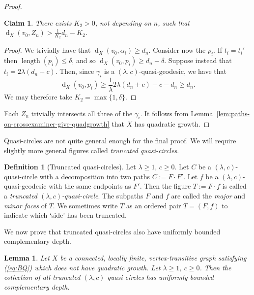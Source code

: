 \documentclass[11pt,a4paper]{amsart}
\DeclareMathOperator{\length}{length}
\DeclareMathOperator{\dist}{d}
\newtheorem{lemma}[theorem]{Lemma}
\newtheorem{claim}[theorem]{Claim}
\theoremstyle{definition}
\newtheorem{definition}[theorem]{Definition}
\newcommand{\property}{(\ref{eq:BQ})}
\begin{document}
\begin{proof}
    \begin{claim}
        There exists $K_2 > 0$, not depending on $n$, such that $\dist_X(v_0, Z_n) > \tfrac 1 {K_2} d_n - K_2$. 
    \end{claim}

    \begin{proof}
        We trivially have that $\dist_X(v_0,\alpha_i) \geq d_n$. Consider now the $p_i$. If $t_i = t_i'$ then $\length(p_i) \leq \delta$, and so $\dist_X(v_0,p_i) \geq d_n - \delta$. Suppose instead that $t_i = 2\lambda(d_n + c)$. Then, since $\gamma_i$ is a $(\lambda,c)$-quasi-geodesic, we have that 
        $$
        \dist_X(v_0,p_i) \geq \frac 1 \lambda 2\lambda(d_n + c) - c - d_n \geq d_n.
        $$
        We may therefore take $K_2 = \max\{1,\delta\}$. 
    \end{proof}

    Each $Z_n$ trivially intersects all three of the $\gamma_i$. It follows from Lemma~\ref{lem:paths-on-crossexaminer-give-quadgrowth} that $X$ has quadratic growth. 
\end{proof}




Quasi-circles are not quite general enough for the final proof. We will require slightly more general figures called \emph{truncated quasi-circles}. 

\begin{definition}[Truncated quasi-circles]
    Let $\lambda \geq 1$, $c \geq 0$. Let $C$ be a $(\lambda, c)$-quasi-circle with a decomposition into two paths $C := F \cdot F'$. Let $f$ be a $(\lambda, c)$-quasi-geodesic with the same endpoints as $F'$. Then the figure $T := F \cdot f$ is called a \emph{truncated $(\lambda, c)$-quasi-circle}.  The subpaths $F$ and $f$ are called the \emph{major} and \emph{minor faces} of $T$.
    We sometimes write $T$ as an ordered pair $T = (F, f)$ to indicate which `side' has been truncated. 
\end{definition}



We now prove that truncated quasi-circles also have uniformly bounded complementary depth.

\begin{lemma}\label{lem:truncated-quasicircles-peripheral}
    Let $X$ be a connected, locally finite, vertex-transitive graph satisfying \property{} which does not have quadratic growth. Let $\lambda \geq 1$, $c \geq 0$.  Then the collection of all truncated $(\lambda, c)$-quasi-circles has uniformly bounded complementary depth.
\end{lemma}
\end{document}
